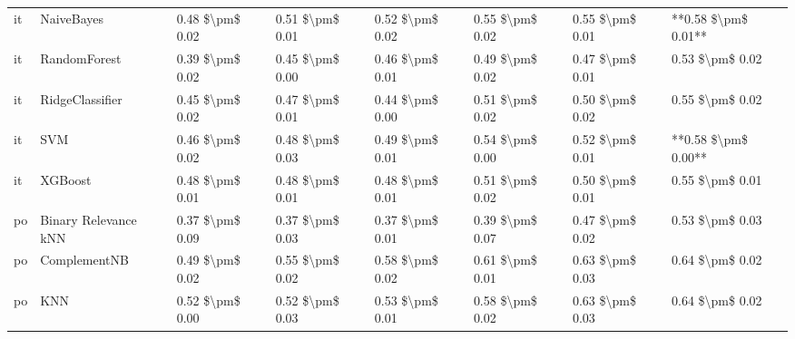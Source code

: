 \begin{tabular}{llllllll}
      it &                      NaiveBayes & 0.48 \$\textbackslash pm\$ 0.02 &           0.51 \$\textbackslash pm\$ 0.01 &       0.52 \$\textbackslash pm\$ 0.02 &        0.55 \$\textbackslash pm\$ 0.02 &                         0.55 \$\textbackslash pm\$ 0.01 & **0.58 \$\textbackslash pm\$ 0.01** \\
      it &                    RandomForest & 0.39 \$\textbackslash pm\$ 0.02 &           0.45 \$\textbackslash pm\$ 0.00 &       0.46 \$\textbackslash pm\$ 0.01 &        0.49 \$\textbackslash pm\$ 0.02 &                         0.47 \$\textbackslash pm\$ 0.01 &     0.53 \$\textbackslash pm\$ 0.02 \\
      it &                 RidgeClassifier & 0.45 \$\textbackslash pm\$ 0.02 &           0.47 \$\textbackslash pm\$ 0.01 &       0.44 \$\textbackslash pm\$ 0.00 &        0.51 \$\textbackslash pm\$ 0.02 &                         0.50 \$\textbackslash pm\$ 0.02 &     0.55 \$\textbackslash pm\$ 0.02 \\
      it &                             SVM & 0.46 \$\textbackslash pm\$ 0.02 &           0.48 \$\textbackslash pm\$ 0.03 &       0.49 \$\textbackslash pm\$ 0.01 &        0.54 \$\textbackslash pm\$ 0.00 &                         0.52 \$\textbackslash pm\$ 0.01 & **0.58 \$\textbackslash pm\$ 0.00** \\
      it &                         XGBoost & 0.48 \$\textbackslash pm\$ 0.01 &           0.48 \$\textbackslash pm\$ 0.01 &       0.48 \$\textbackslash pm\$ 0.01 &        0.51 \$\textbackslash pm\$ 0.02 &                         0.50 \$\textbackslash pm\$ 0.01 &     0.55 \$\textbackslash pm\$ 0.01 \\
      po &            Binary Relevance kNN & 0.37 \$\textbackslash pm\$ 0.09 &           0.37 \$\textbackslash pm\$ 0.03 &       0.37 \$\textbackslash pm\$ 0.01 &        0.39 \$\textbackslash pm\$ 0.07 &                         0.47 \$\textbackslash pm\$ 0.02 &     0.53 \$\textbackslash pm\$ 0.03 \\
      po &                    ComplementNB & 0.49 \$\textbackslash pm\$ 0.02 &           0.55 \$\textbackslash pm\$ 0.02 &       0.58 \$\textbackslash pm\$ 0.02 &        0.61 \$\textbackslash pm\$ 0.01 &                         0.63 \$\textbackslash pm\$ 0.03 &     0.64 \$\textbackslash pm\$ 0.02 \\
      po &                             KNN & 0.52 \$\textbackslash pm\$ 0.00 &           0.52 \$\textbackslash pm\$ 0.03 &       0.53 \$\textbackslash pm\$ 0.01 &        0.58 \$\textbackslash pm\$ 0.02 &                         0.63 \$\textbackslash pm\$ 0.03 &     0.64 \$\textbackslash pm\$ 0.02 \\

\end{tabular}
